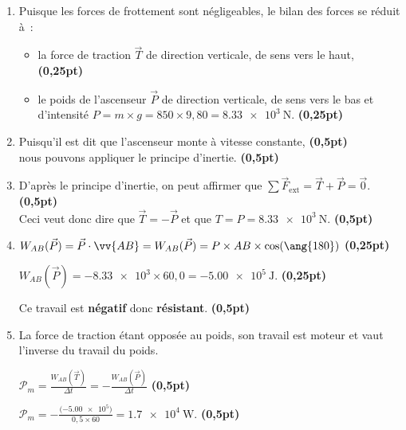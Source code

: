 \begin{enumerate}
    \item Puisque les forces de frottement sont négligeables, le bilan des
          forces se réduit à~:
          \begin{itemize}
              \item la force de traction $\vec{T}$ de direction verticale, de
                    sens vers le haut,
                    \hfill\textbf{(0,25pt)}
              \item le poids de l'ascenseur $\vec{P}$ de direction verticale, de
                    sens vers le bas et d'intensité
                    $P=m\times g=850\times 9,80=\qty{8.33e3}{\N}$.
                    \hfill\textbf{(0,25pt)}
          \end{itemize}
    \item Puisqu'il est dit que l'ascenseur monte à vitesse constante,
          \hfill\textbf{(0,5pt)} \\
          nous pouvons appliquer le principe d'inertie.
          \hfill\textbf{(0,5pt)}
    \item D'après le principe d'inertie, on peut affirmer que
          $\sum\vec{F}_{\text{ext}}=\vec{T}+\vec{P}=\vec{0}$.
          \hfill\textbf{(0,5pt)} \\
          Ceci veut donc dire que
          $\vec{T}=-\vec{P}$ et que $T=P=\qty{8.33e3}{\N}$.
          \hfill\textbf{(0,5pt)}
    \item $W_{AB}(\vec{P})=\vec{P}\cdot\vv{AB}=W_{AB}(\vec{P})=
          P\times AB\times\cos(\ang{180})$
          \hfill\textbf{(0,25pt)}

          $W_{AB}(\vec{P})=-\num{8.33e3}\times 60,0=\qty{-5.00e5}{\J}$.
          \hfill\textbf{(0,25pt)}

          Ce travail est \textbf{négatif} donc \textbf{résistant}.
          \hfill\textbf{(0,5pt)}
    \item La force de traction étant opposée au poids, son travail est moteur et
          vaut l'inverse du travail du poids.
          
          $\mathcal{P}_{m}=\frac{W_{AB}(\vec{T})}{\Delta t}=
          -\frac{W_{AB}(\vec{P})}{\Delta t}$
          \hfill\textbf{(0,5pt)}

          $\mathcal{P}_{m}=-\frac{\bigl(\num{-5.00e5}\bigr)}{0,5\times 60}=
          \qty{1.7e4}{\W}$.
          \hfill\textbf{(0,5pt)}
\end{enumerate}
